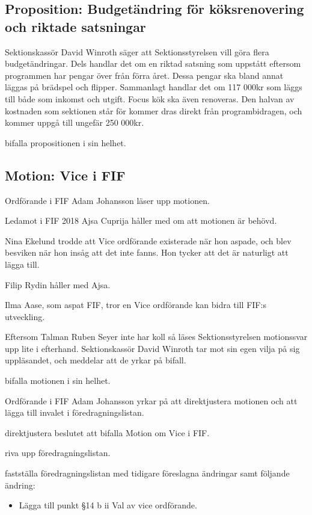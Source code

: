 \documentclass[hidelinks]{sektionsmote}
\begin{document}
\subsection{Proposition: Budgetändring för köksrenovering och riktade satsningar}
Sektionskassör David Winroth säger att Sektionsstyrelsen vill göra flera budgetändringar.
Dels handlar det om en riktad satsning som uppstått eftersom programmen har pengar över från förra året.
Dessa pengar ska bland annat läggas på brädspel och flipper.
Sammanlagt handlar det om 117 000kr som läggs till både som inkomst och utgift.
Focus kök ska även renoveras.
Den halvan av kostnaden som sektionen står för kommer dras direkt från programbidragen, och kommer uppgå till ungefär 250 000kr.

\begin{beslut}
  \item bifalla propositionen i sin helhet.
\end{beslut}


\subsection{Motion: Vice i FIF}
Ordförande i FIF Adam Johansson läser upp motionen.%

Ledamot i FIF 2018 Ajsa Cuprija håller med om att motionen är behövd.

Nina Ekelund trodde att Vice ordförande existerade när hon aspade, och blev besviken när hon insåg att det inte fanns.
Hon tycker att det är naturligt att lägga till.

Filip Rydin håller med Ajsa.

Ilma Aase, som aspat FIF, tror en Vice ordförande kan bidra till FIF:s utveckling.

Eftersom Talman Ruben Seyer inte har koll så läses Sektionsstyrelsen motionssvar upp lite i efterhand. %
Sektionskassör David Winroth tar mot sin egen vilja på sig uppläsandet, och meddelar att de yrkar på bifall.

\begin{beslut}
  \item bifalla motionen i sin helhet. %
\end{beslut}

\begin{ofraga}
  Ordförande i FIF Adam Johansson yrkar på att direktjustera motionen och att lägga till invalet i föredragningslistan.
  \begin{beslut}
    \item direktjustera beslutet att bifalla Motion om Vice i FIF.%
    \item riva upp föredragningslistan.
    \item fastställa föredragningslistan med tidigare föreslagna ändringar samt följande ändring:%
    \begin{itemize}
      \item Lägga till punkt §14 b ii Val av vice ordförande.
    \end{itemize}
  \end{beslut}
\end{ofraga}
\end{document}
